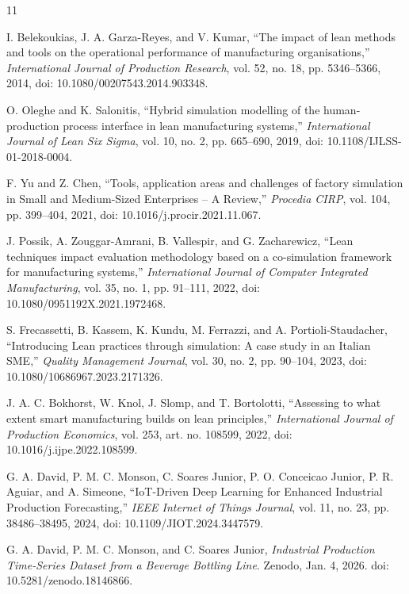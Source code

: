 \documentclass[12pt,a4paper]{article}
\begin{document}
\begin{thebibliography}{11}

I. Belekoukias, J. A. Garza-Reyes, and V. Kumar, ``The impact of lean methods and tools on the operational performance of manufacturing organisations,'' \emph{International Journal of Production Research}, vol. 52, no. 18, pp. 5346--5366, 2014, doi: 10.1080/00207543.2014.903348.

O. Oleghe and K. Salonitis, ``Hybrid simulation modelling of the human-production process interface in lean manufacturing systems,'' \emph{International Journal of Lean Six Sigma}, vol. 10, no. 2, pp. 665--690, 2019, doi: 10.1108/IJLSS-01-2018-0004.

F. Yu and Z. Chen, ``Tools, application areas and challenges of factory simulation in Small and Medium-Sized Enterprises -- A Review,'' \emph{Procedia CIRP}, vol. 104, pp. 399--404, 2021, doi: 10.1016/j.procir.2021.11.067.

J. Possik, A. Zouggar-Amrani, B. Vallespir, and G. Zacharewicz, ``Lean techniques impact evaluation methodology based on a co-simulation framework for manufacturing systems,'' \emph{International Journal of Computer Integrated Manufacturing}, vol. 35, no. 1, pp. 91--111, 2022, doi: 10.1080/0951192X.2021.1972468.

S. Frecassetti, B. Kassem, K. Kundu, M. Ferrazzi, and A. Portioli-Staudacher, ``Introducing Lean practices through simulation: A case study in an Italian SME,'' \emph{Quality Management Journal}, vol. 30, no. 2, pp. 90--104, 2023, doi: 10.1080/10686967.2023.2171326.

J. A. C. Bokhorst, W. Knol, J. Slomp, and T. Bortolotti, ``Assessing to what extent smart manufacturing builds on lean principles,'' \emph{International Journal of Production Economics}, vol. 253, art. no. 108599, 2022, doi: 10.1016/j.ijpe.2022.108599.

G. A. David, P. M. C. Monson, C. Soares Junior, P. O. Conceicao Junior, P. R. Aguiar, and A. Simeone, ``IoT-Driven Deep Learning for Enhanced Industrial Production Forecasting,'' \emph{IEEE Internet of Things Journal}, vol. 11, no. 23, pp. 38486--38495, 2024, doi: 10.1109/JIOT.2024.3447579.

G. A. David, P. M. C. Monson, and C. Soares Junior, \emph{Industrial Production Time-Series Dataset from a Beverage Bottling Line}. Zenodo, Jan. 4, 2026. doi: 10.5281/zenodo.18146866.


\end{thebibliography}
\end{document}
